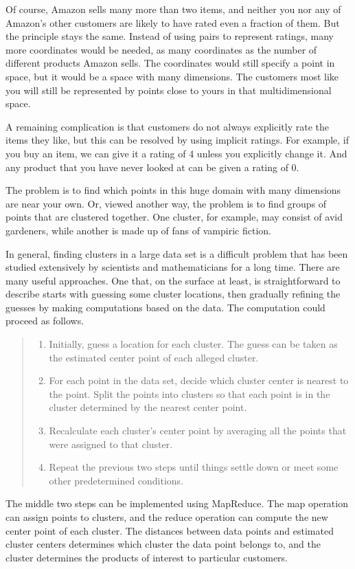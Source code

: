 Of course, Amazon sells many more than two items, and neither you nor any
of Amazon's other customers are likely to have rated even a fraction of them.
But the principle stays the same.  Instead of using pairs to represent
ratings, many more coordinates would be needed, as many coordinates
as the number of different products Amazon sells.
The coordinates would still specify a point in space,
but it would be a space with many dimensions.
The customers most like you will still be represented by points close to yours
in that multidimensional space.

A remaining complication is that customers do not always explicitly rate the
items they like, but this can be resolved by using implicit ratings.
For example, if you buy an item, we can give it a rating of 4 unless you
explicitly change it.  And any product that you have never looked at
can be given a rating of 0.

The problem is to find which points in this huge domain with many dimensions
are near your own. Or, viewed another way, the problem is to find groups of
points that are clustered together. One cluster, for example, may consist of
avid gardeners, while another is made up of fans of vampiric fiction.

In general, finding clusters
in a large data set is a difficult problem
that has been studied extensively
by scientists and mathematicians for a long time.
There are many useful approaches.  One that, on the surface at least,
is straightforward to describe starts with guessing some cluster locations,
then gradually refining the guesses by making computations based on the data.
The computation could proceed as follows.
\begin{quote}
\label{cluster-process}
\begin{enumerate}
    \item Initially, guess a location for each cluster. The guess can be
        taken as the estimated center point of each alleged cluster.
    \item For each point in the data set, decide which cluster center is nearest
        to the point.  Split the points into clusters so that each point is
        in the cluster determined by the nearest center point.
    \item Recalculate each cluster's center point by averaging all the
        points that were assigned to that cluster.
    \item Repeat the previous two steps until things settle down or meet
        some other predetermined conditions.
\end{enumerate}
\end{quote}
The middle two steps can be implemented using MapReduce.  The map operation can
assign points to clusters, and the reduce operation can compute the new center
point of each cluster.  The distances between data points
and estimated cluster centers determines which cluster the data point belongs to,
and the cluster determines the products of interest to particular customers.

